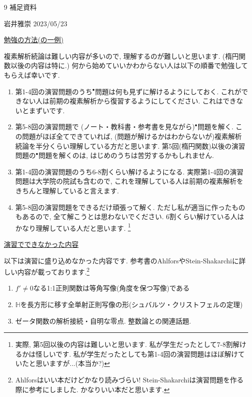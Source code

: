\documentclass[dvipdfmx,a4paper,11pt]{article}
\theoremstyle{definition}
\begin{document}
 
\newpage


\begin{center}
{\Large 9 補足資料}
\end{center}

\begin{flushright}
 岩井雅崇 2023/05/23
\end{flushright}

\vspace{12pt}
\hspace{-24pt}\underline{勉強の方法(の一例)}

複素解析続論は難しい内容が多いので, 理解するのが難しいと思います. (楕円関数以後の内容は特に.)
何から始めていいかわからない人は以下の順番で勉強してもらえば幸いです. 

       \begin{enumerate}
\setlength{\parskip}{0cm} 
  \setlength{\itemsep}{0cm} 
    \item 第1-4回の演習問題のうち$^{\bullet}$問題は何も見ずに解けるようにしておく.  これができない人は前期の複素解析から復習するようにしてください. これはできないとまずいです.
  \item 第5-8回の演習問題で (ノート・教科書・参考書を見ながら)$^{\bullet}$問題を解く. この問題がほぼ全てできていれば, (問題が解けるかはわからないが)複素解析続論を半分くらい理解している方だと思います. 第5回(楕円関数)以後の演習問題の$^{\bullet}$問題を解くのは, はじめのうちは苦労するかもしれません.
      \item 第1-4回の演習問題のうち6-8割くらい解けるようになる. 実際第1-4回の演習問題は大学院の院試も含むので, これを理解している人は前期の複素解析をきちんと理解していると言えます.
      \item  第5-8回の演習問題をできるだけ頑張って解く. ただし私が適当に作ったものもあるので, 全て解こうとは思わないでください.  6割くらい解けている人はかなり理解している人だと思います. \footnote{実際, 第5回以後の内容は難しいと思います. 私が学生だったとして7-8割解けるかは怪しいです. 私が学生だったとしても第1-4回の演習問題はほぼ解けていたと思いますが...(本当か?)}
  \end{enumerate}
  
  \vspace{12pt}
\hspace{-24pt}\underline{演習でできなかった内容}

以下は演習に盛り込めなかった内容です. 参考書のAhlforsやStein-Shakarchiに詳しい内容が載っております.\footnote{Ahlforsはいい本だけどかなり読みづらい! Stein-Shakarchiは演習問題を作る際に参考にしました. かなりいい本だと思います.} 
\begin{enumerate}
\setlength{\parskip}{0cm} 
  \setlength{\itemsep}{0cm} 
  \item $f' \neq 0$なる1:1正則関数は等角写像(角度を保つ写像)である
  \item $\mathbb{H}$を長方形に移す全単射正則写像の形(シュバルツ・クリストフェルの定理)
  \item ゼータ関数の解析接続・自明な零点. 整数論との関連話題.
  \end{enumerate}
\end{document}
